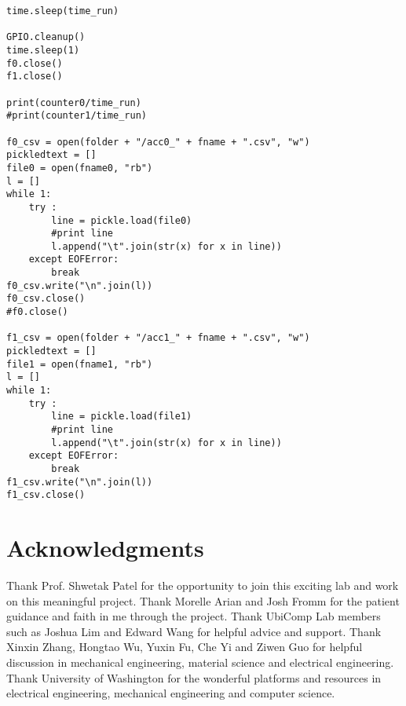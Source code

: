\documentclass{sigchi}
\begin{document}
\begin{lstlisting}
time.sleep(time_run)

GPIO.cleanup()
time.sleep(1)
f0.close()
f1.close()

print(counter0/time_run)
#print(counter1/time_run)

f0_csv = open(folder + "/acc0_" + fname + ".csv", "w")
pickledtext = []
file0 = open(fname0, "rb")
l = []
while 1:
    try :
        line = pickle.load(file0)
        #print line
        l.append("\t".join(str(x) for x in line))
    except EOFError:
        break
f0_csv.write("\n".join(l))
f0_csv.close()
#f0.close()

f1_csv = open(folder + "/acc1_" + fname + ".csv", "w")
pickledtext = []
file1 = open(fname1, "rb")
l = []
while 1:
    try :
        line = pickle.load(file1)
        #print line
        l.append("\t".join(str(x) for x in line))
    except EOFError:
        break
f1_csv.write("\n".join(l))
f1_csv.close()
\end{lstlisting}

\section{Acknowledgments}

Thank Prof. Shwetak Patel for the opportunity to join this exciting lab and work on this meaningful project. Thank Morelle Arian and Josh Fromm for the patient guidance and faith in me through the project. Thank UbiComp Lab members such as Joshua Lim and Edward Wang for helpful advice and support. Thank Xinxin Zhang, Hongtao Wu, Yuxin Fu, Che Yi and Ziwen Guo for helpful discussion in mechanical engineering, material science and electrical engineering. Thank University of Washington for the wonderful platforms and resources in electrical engineering, mechanical engineering and computer science. 

\balance{}




\end{document}
